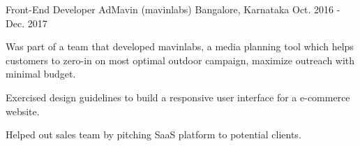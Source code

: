 \begin{cventries}
  \cventry
  {Front-End Developer} %
  {AdMavin (mavinlabs)} %
  {Bangalore, Karnataka} %
  {Oct. 2016 - Dec. 2017} %
  {
    \begin{cvitems} %
      \item {Was part of a team that developed mavinlabs, a media planning tool which helps customers to zero-in on most optimal outdoor campaign, maximize outreach with minimal budget.}
      \item {Exercised design guidelines to build a responsive user interface for a e-commerce website.}
      \item {Helped out sales team by pitching SaaS platform to potential clients.}
    \end{cvitems}
  }

\end{cventries}
